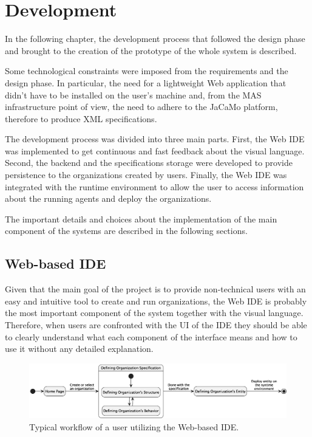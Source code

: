 \chapter{Development}\label{development}

In the following chapter, the development process that followed the design phase and brought to the creation of the prototype of the whole system is described.

Some technological constraints were imposed from the requirements and the design phase.
In particular, the need for a lightweight Web application that didn't have to be installed on the user's machine and, from the MAS infrastructure point of view, the need to adhere to the JaCaMo platform, therefore to produce XML \moise{} specifications.

The development process was divided into three main parts.
First, the Web IDE was implemented to get continuous and fast feedback about the visual language.
Second, the backend and the specifications storage were developed to provide persistence to the organizations created by users.
Finally, the Web IDE was integrated with the runtime environment to allow the user to access information about the running agents and deploy the organizations.

The important details and choices about the implementation of the main component of the systems are described in the following sections.

\section{Web-based IDE}
Given that the main goal of the project is to provide non-technical users with an easy and intuitive tool to create and run organizations, the Web IDE is probably the most important component of the system together with the visual language.
Therefore, when users are confronted with the UI of the IDE they should be able to clearly understand what each component of the interface means and how to use it without any detailed explanation.

\begin{figure}
    \centering
    \includegraphics[width=\linewidth]{images/web-ide.eps}
    \caption{Typical workflow of a user utilizing the Web-based IDE.}
    \label{fig:ide}
\end{figure}


